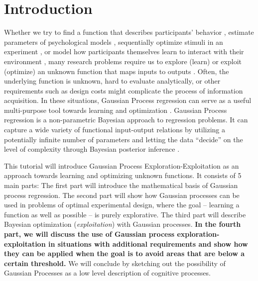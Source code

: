 \documentclass[authoryear,11pt,review]{elsarticle}
\newcommand{\fixme}[1]{\textbf{#1}}
\begin{document}
\section{Introduction}
Whether we try to find a function that describes participants' behavior \citep{cavagnaro2014functional}, estimate parameters of psychological models \citep{wetzels2010bayesian}, sequentially optimize stimuli in an experiment \citep{myung2009optimal}, or model how participants themselves learn to interact with their environment \citep{meder2012information}, many research problems require us to explore (learn) or exploit (optimize) an unknown function that maps inputs to outputs \citep{mockus2010bayesian}. Often, the underlying function is unknown, hard to evaluate analytically, or other requirements such as design costs might complicate the process of information acquisition. In these situations, Gaussian Process regression can serve as a useful multi-purpose tool towards learning and optimization \citep{rasmussen2006gaussian}. Gaussian Process regression is a non-parametric Bayesian approach \citep{gershman2012tutorial} to regression problems. It can capture a wide variety of functional input-output relations by utilizing a potentially infinite number of parameters and letting the data ``decide'' on the level of complexity through Bayesian posterior inference \citep{williams1998prediction}.

This tutorial will introduce Gaussian Process Exploration-Exploitation as an approach towards learning and optimizing unknown functions. %
It consists of 5 main parts: The first part will introduce the mathematical basis of Gaussian process regression. The second part will show how Gaussian processes can be used in problems of optimal experimental design, where the goal -- learning a function as well as possible -- is purely explorative. The third part will describe Bayesian optimization (\emph{exploitation}) with Gaussian processes. \fixme{In the fourth part, we will discuss the use of Gaussian process exploration-exploitation in situations with additional requirements and show how they can be applied when the goal is to avoid areas that are below a certain threshold.} We will conclude by sketching out the possibility of Gaussian Processes as a low level description of cognitive processes.


\end{document}
